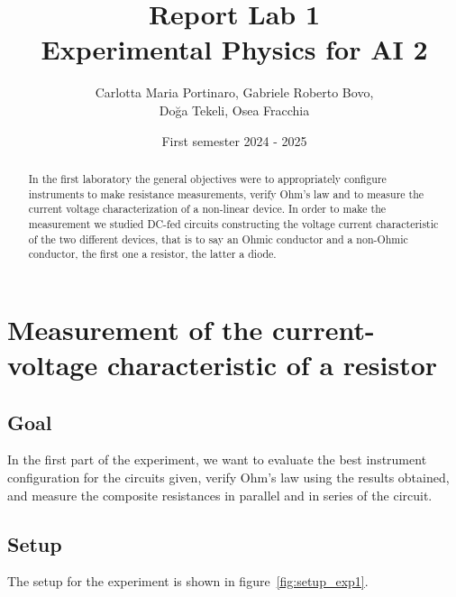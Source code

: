 \documentclass[notitlepage]{report}
\title{Report Lab 1\\\small Experimental Physics for AI 2}
\author{Carlotta Maria Portinaro, Gabriele Roberto Bovo, \\ Doğa Tekeli, Osea
Fracchia}
\date{First semester 2024 \-- 2025}
\numberwithin{equation}{section}
\theoremstyle{plain}
\theoremstyle{definition}
\theoremstyle{remark}
\begin{document}
\maketitle

\begin{abstract}

In the first laboratory the general objectives were to appropriately configure
instruments to make resistance measurements, verify Ohm’s law and to measure
the current voltage characterization of a non-linear device. In order to make
the measurement we studied DC-fed circuits constructing the voltage current
characteristic of the two different devices, that is to say an Ohmic conductor
and a non-Ohmic conductor, the first one a resistor, the latter a diode.
    
\end{abstract}


\chapter{Measurement of the current-voltage characteristic of a resistor}
\section{Goal}
In the first part of the experiment, we want to evaluate the best instrument
configuration for the circuits given, verify Ohm’s law using the results
obtained, and measure the composite resistances in parallel and in series of the
circuit.

\section{Setup}

The setup for the experiment is shown in
figure~\ref{fig:setup_exp1}.
\end{document}

